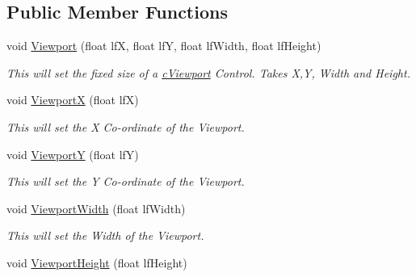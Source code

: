 \subsection*{Public Member Functions}
\begin{DoxyCompactItemize}
\item 
\hypertarget{classc_viewport_control_aa6a247ab5ceba96ba5fb7e62f437bcab}{
void \hyperlink{classc_viewport_control_aa6a247ab5ceba96ba5fb7e62f437bcab}{Viewport} (float lfX, float lfY, float lfWidth, float lfHeight)}
\label{classc_viewport_control_aa6a247ab5ceba96ba5fb7e62f437bcab}

\begin{DoxyCompactList}\small\item\em This will set the fixed size of a \hyperlink{classc_viewport}{cViewport} Control. Takes X,Y, Width and Height. \end{DoxyCompactList}\item 
\hypertarget{classc_viewport_control_abf9547c7d226676f365be5ca7e8902c6}{
void \hyperlink{classc_viewport_control_abf9547c7d226676f365be5ca7e8902c6}{ViewportX} (float lfX)}
\label{classc_viewport_control_abf9547c7d226676f365be5ca7e8902c6}

\begin{DoxyCompactList}\small\item\em This will set the X Co-\/ordinate of the Viewport. \end{DoxyCompactList}\item 
\hypertarget{classc_viewport_control_a1d04f9918c03552877be7d7c2ece62b8}{
void \hyperlink{classc_viewport_control_a1d04f9918c03552877be7d7c2ece62b8}{ViewportY} (float lfY)}
\label{classc_viewport_control_a1d04f9918c03552877be7d7c2ece62b8}

\begin{DoxyCompactList}\small\item\em This will set the Y Co-\/ordinate of the Viewport. \end{DoxyCompactList}\item 
\hypertarget{classc_viewport_control_a26c50c8441fcd1d1bc2c4649df7cf17b}{
void \hyperlink{classc_viewport_control_a26c50c8441fcd1d1bc2c4649df7cf17b}{ViewportWidth} (float lfWidth)}
\label{classc_viewport_control_a26c50c8441fcd1d1bc2c4649df7cf17b}

\begin{DoxyCompactList}\small\item\em This will set the Width of the Viewport. \end{DoxyCompactList}\item 
\hypertarget{classc_viewport_control_a7b5e508f96f8225a1a37e12b50b9c0d7}{
void \hyperlink{classc_viewport_control_a7b5e508f96f8225a1a37e12b50b9c0d7}{ViewportHeight} (float lfHeight)}
\label{classc_viewport_control_a7b5e508f96f8225a1a37e12b50b9c0d7}


\end{DoxyCompactItemize}
